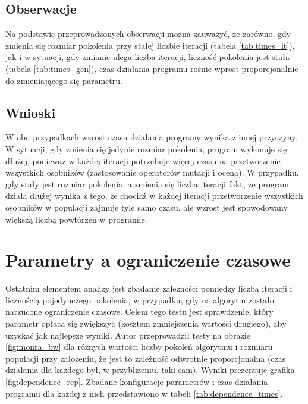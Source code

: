 \subsection{Obserwacje}
Na podstawie przeprowadzonych obserwacji można zauważyć, że zarówno, gdy zmienia się rozmiar pokolenia przy stałej liczbie iteracji (tabela \ref{tab:times_it}), jak i w sytuacji, gdy zmianie ulega liczba iteracji, liczność pokolenia jest stała (tabela \ref{tab:times_gen}), czas działania programu rośnie wprost proporcjonalnie do zmieniającego się parametru.

\subsection{Wnioski}
W obu przypadkach wzrost czasu działania programy wynika z innej przyczyny. W sytuacji, gdy zmienia się jedynie rozmiar pokolenia, program wykonuje się dłużej, ponieważ w każdej iteracji potrzebuje więcej czasu na przetworzenie wszystkich osobników (zastosowanie operatorów mutacji i ocena). W przypadku, gdy stały jest rozmiar pokolenia, a zmienia się liczba iteracji fakt, że program działa dłużej wynika z tego, że chociaż w każdej iteracji przetworzenie wszystkich osobników w populacji zajmuje tyle samo czasu, ale wzrost jest spowodowany większą liczbą powtórzeń w programie.

\section{Parametry a ograniczenie czasowe}

Ostatnim elementem analizy jest zbadanie zależności pomiędzy liczbą iteracji i licznością pojedynczego pokolenia, w przypadku, gdy na algorytm zostało narzucone ograniczenie czasowe. Celem tego testu jest sprawdzenie, który parametr opłaca się zwiększyć (kosztem zmniejszenia wartości drugiego), aby uzyskać jak najlepsze wyniki. Autor przeprowadził testy na obrazie \ref{fig:monra_bw} dla różnych wartości liczby pokoleń algorytmu i rozmiaru populacji przy założeniu, że jest to zależność odwrotnie proporcjonalna (czas działania dla każdego był, w przybliżeniu, taki sam). Wyniki prezentuje grafika \ref{fig:dependence_rep}. Zbadane konfiguracje parametrów i czas działania programu dla każdej z nich przedstawiono w tabeli \ref{tab:dependence_times}. 

